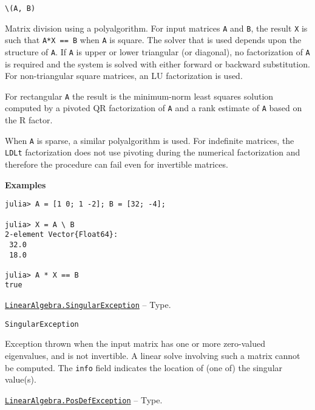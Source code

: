 \begin{adjustwidth}{2em}{0pt}


\begin{verbatim}
\(A, B)
\end{verbatim}

Matrix division using a polyalgorithm. For input matrices \texttt{A} and \texttt{B}, the result \texttt{X} is such that \texttt{A*X == B} when \texttt{A} is square. The solver that is used depends upon the structure of \texttt{A}.  If \texttt{A} is upper or lower triangular (or diagonal), no factorization of \texttt{A} is required and the system is solved with either forward or backward substitution. For non-triangular square matrices, an LU factorization is used.

For rectangular \texttt{A} the result is the minimum-norm least squares solution computed by a pivoted QR factorization of \texttt{A} and a rank estimate of \texttt{A} based on the R factor.

When \texttt{A} is sparse, a similar polyalgorithm is used. For indefinite matrices, the \texttt{LDLt} factorization does not use pivoting during the numerical factorization and therefore the procedure can fail even for invertible matrices.

\textbf{Examples}


\begin{verbatim}
julia> A = [1 0; 1 -2]; B = [32; -4];

julia> X = A \ B
2-element Vector{Float64}:
 32.0
 18.0

julia> A * X == B
true
\end{verbatim}



\end{adjustwidth}
\hypertarget{3093579424646561023}{}
\hyperlink{3093579424646561023}{\texttt{LinearAlgebra.SingularException}}  -- {Type.}

\begin{adjustwidth}{2em}{0pt}


\begin{verbatim}
SingularException
\end{verbatim}

Exception thrown when the input matrix has one or more zero-valued eigenvalues, and is not invertible. A linear solve involving such a matrix cannot be computed. The \texttt{info} field indicates the location of (one of) the singular value(s).



\end{adjustwidth}
\hypertarget{12039872206324733514}{}
\hyperlink{12039872206324733514}{\texttt{LinearAlgebra.PosDefException}}  -- {Type.}

